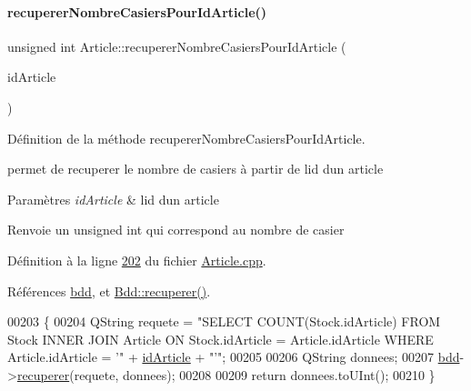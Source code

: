 \paragraph{\texorpdfstring{recuperer\+Nombre\+Casiers\+Pour\+Id\+Article()}{recupererNombreCasiersPourIdArticle()}}
{\footnotesize\ttfamily unsigned int Article\+::recuperer\+Nombre\+Casiers\+Pour\+Id\+Article (\begin{DoxyParamCaption}\item[{Q\+String}]{id\+Article }\end{DoxyParamCaption})\hspace{0.3cm}{\ttfamily [static]}}



Définition de la méthode recuperer\+Nombre\+Casiers\+Pour\+Id\+Article. 

permet de recuperer le nombre de casiers à partir de l\textquotesingle{}id d\textquotesingle{}un article 
\begin{DoxyParams}{Paramètres}
{\em id\+Article} & l\textquotesingle{}id d\textquotesingle{}un article \\
\hline
\end{DoxyParams}
\begin{DoxyReturn}{Renvoie}
un unsigned int qui correspond au nombre de casier 
\end{DoxyReturn}


Définition à la ligne \hyperlink{_article_8cpp_source_l00202}{202} du fichier \hyperlink{_article_8cpp_source}{Article.\+cpp}.



Références \hyperlink{_article_8h_source_l00082}{bdd}, et \hyperlink{_bdd_8cpp_source_l00187}{Bdd\+::recuperer()}.


\begin{DoxyCode}
00203 \{
00204     QString requete = \textcolor{stringliteral}{"SELECT COUNT(Stock.idArticle) FROM Stock INNER JOIN Article ON Stock.idArticle =
       Article.idArticle WHERE Article.idArticle = '"} + \hyperlink{class_article_a9f2f7a04139f26accec145066a5aacae}{idArticle} + \textcolor{stringliteral}{"'"};
00205 
00206     QString donnees;
00207     \hyperlink{class_article_a7221cec4212d86d74f479b9ee683ee8a}{bdd}->\hyperlink{class_bdd_a8f25d29d309041bbf875700db0efd97b}{recuperer}(requete, donnees);
00208 
00209     \textcolor{keywordflow}{return} donnees.toUInt();
00210 \}
\end{DoxyCode}
\mbox{\label{class_article_acdd796ad55a7fde0c229c8c2df7050cc}} 

